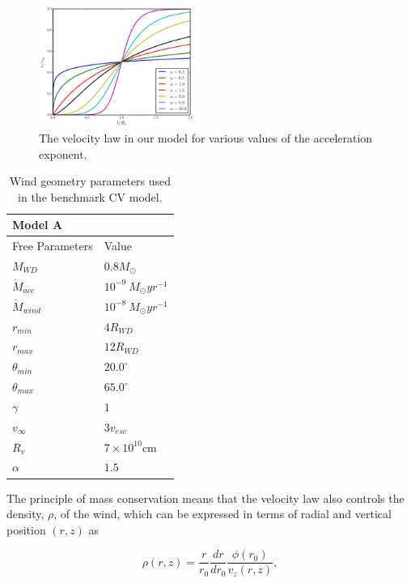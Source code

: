 \documentclass[preprint, a4paper, 11pt]{aastex}
\begin{document}
\begin{figure}
\centering
\includegraphics[width=0.45\textwidth]{figures/acc_law.eps}
\caption{
The velocity law in our model for various values of
the acceleration exponent.
}
\label{acc_law}
\end{figure}


\begin{table}
\centering
\begin{tabular}{p{3cm}p{4cm}}
Model A \\
\hline Free Parameters 	&	 Value \\ 
\hline \hline 
$M_{WD}$ 	 &	 $0.8 M_{\odot}$ \\ 
$\dot{M}_{acc}$ 	 &	 $10^{-9}~M_{\odot}yr^{-1}$\\ 
$\dot{M}_{wind}$  &	$10^{-8}~M_{\odot}yr^{-1}$\\ 
$r_{min}$ 	&	 $4 R_{WD}$\\ 
$r_{max}$ 	&	 $12 R_{WD}$ \\ 
$\theta_{min}$ 	&	 $20.0^{\circ}$ \\ 
$\theta_{max}$ 	&	 $65.0^{\circ}$ \\ 
$\gamma$ 	&	 $1$ \\ 
$v_{\infty}$ 	&	 $3v_{esc}$ \\ 
$R_v$ 	        &	 $7\times10^{10}$cm \\ 
$\alpha$ 	&	 $1.5$ \\
\end{tabular}
\centering
\caption{
Wind geometry parameters used in the benchmark CV model.}
\label{wind_param}
\end{table}


The principle of mass conservation means that the velocity law also 
controls the density, $\rho$, of the wind, which can be expressed in terms
of radial and vertical position $(r,z)$ as 

\begin{equation}
\rho(r,z) = \frac{r}{r_0} \frac{dr}{dr_0} \frac{\phi(r_0)}{v_z(r,z)},
\label{density}
\end{equation}
\end{document}
